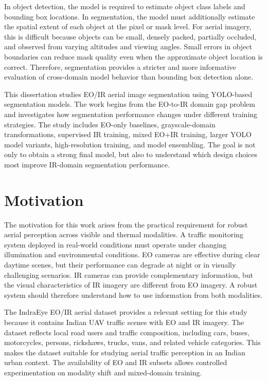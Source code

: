 In object detection, the model is required to estimate object class labels and bounding box locations. In segmentation, the model must additionally estimate the spatial extent of each object at the pixel or mask level. For aerial imagery, this is difficult because objects can be small, densely packed, partially occluded, and observed from varying altitudes and viewing angles. Small errors in object boundaries can reduce mask quality even when the approximate object location is correct. Therefore, segmentation provides a stricter and more informative evaluation of cross-domain model behavior than bounding box detection alone.

This dissertation studies EO/IR aerial image segmentation using YOLO-based segmentation models. The work begins from the EO-to-IR domain gap problem and investigates how segmentation performance changes under different training strategies. The study includes EO-only baselines, grayscale-domain transformations, supervised IR training, mixed EO+IR training, larger YOLO model variants, high-resolution training, and model ensembling. The goal is not only to obtain a strong final model, but also to understand which design choices most improve IR-domain segmentation performance.

\section{Motivation}

The motivation for this work arises from the practical requirement for robust aerial perception across visible and thermal modalities. A traffic monitoring system deployed in real-world conditions must operate under changing illumination and environmental conditions. EO cameras are effective during clear daytime scenes, but their performance can degrade at night or in visually challenging scenarios. IR cameras can provide complementary information, but the visual characteristics of IR imagery are different from EO imagery. A robust system should therefore understand how to use information from both modalities.

The IndraEye EO/IR aerial dataset provides a relevant setting for this study because it contains Indian UAV traffic scenes with EO and IR imagery. The dataset reflects local road users and traffic composition, including cars, buses, motorcycles, persons, rickshaws, trucks, vans, and related vehicle categories. This makes the dataset suitable for studying aerial traffic perception in an Indian urban context. The availability of EO and IR subsets allows controlled experimentation on modality shift and mixed-domain training.


